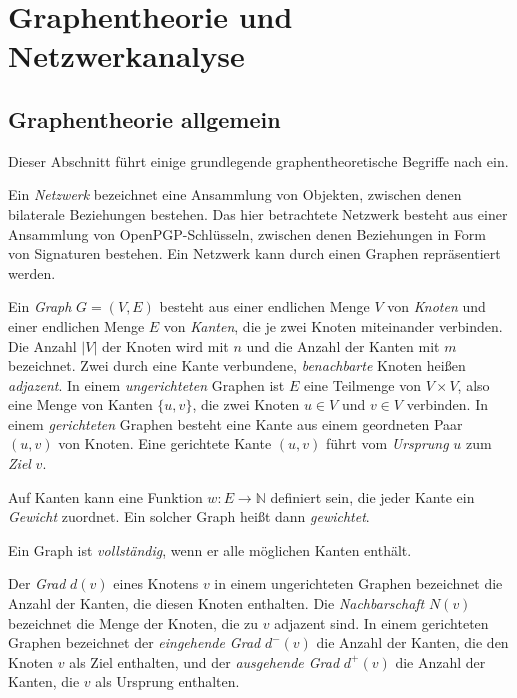\section{Graphentheorie und Netzwerkanalyse}
\label{sec:graph-und-netzw}

\subsection{Graphentheorie allgemein}
\label{ch:Grundlagen:sec:Graphentheorie}

Dieser Abschnitt führt einige grundlegende graphentheoretische
Begriffe nach \cite{Brandes2004} ein.
  
Ein \emph{Netzwerk} bezeichnet eine Ansammlung von Objekten, zwischen
denen bilaterale Beziehungen bestehen. Das hier betrachtete Netzwerk
besteht aus einer Ansammlung von OpenPGP-Schlüsseln, zwischen denen
Beziehungen in Form von Signaturen bestehen. Ein Netzwerk kann durch einen
Graphen repräsentiert werden.

Ein \emph{Graph} $G=(V, E)$ besteht aus einer endlichen Menge $V$ von
\emph{Knoten} und einer endlichen Menge $E$ von \emph{Kanten}, die je
zwei Knoten miteinander verbinden. Die Anzahl $|V|$ der Knoten wird mit
$n$ und die Anzahl der Kanten mit $m$ bezeichnet. Zwei durch eine
Kante verbundene, \emph{benachbarte} Knoten heißen
\emph{adjazent}. In einem \emph{ungerichteten} Graphen ist $E$ eine
Teilmenge von $V\times V$, also eine Menge von Kanten $\{u, v\}$, die
zwei Knoten $u \in V$ und $v\in V$ verbinden. In einem
\emph{gerichteten} Graphen besteht eine Kante aus einem geordneten
Paar $(u, v)$ von Knoten. Eine gerichtete Kante $(u, v)$ führt vom
\emph{Ursprung} $u$ zum \emph{Ziel} $v$.

Auf Kanten kann eine Funktion $w: E \rightarrow \mathbb{N}$ definiert
sein, die jeder Kante ein \emph{Gewicht} zuordnet. Ein solcher Graph
heißt dann \emph{gewichtet}.

Ein Graph ist \emph{vollständig}, wenn er alle möglichen Kanten
enthält.

Der \emph{Grad} $d(v)$ eines Knotens $v$ in einem ungerichteten
Graphen bezeichnet die Anzahl der Kanten, die diesen Knoten
enthalten. Die \emph{Nachbarschaft} $N(v)$ bezeichnet die Menge der
Knoten, die zu $v$ adjazent sind. In einem gerichteten Graphen
bezeichnet der \emph{eingehende Grad} $d^{-}(v)$ die Anzahl der
Kanten, die den Knoten $v$ als Ziel enthalten, und der
\emph{ausgehende Grad} $d^{+}(v)$ die Anzahl der Kanten, die $v$ als
Ursprung enthalten.


